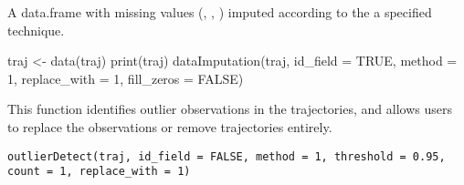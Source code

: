 \documentclass[a4paper]{book}
\begin{document}
%
\begin{Value}
A data.frame with missing values (, , ) imputed according to the a specified technique.
\end{Value}
%
\begin{Examples}
\begin{ExampleCode}
traj <- data(traj)
print(traj)
 dataImputation(traj, id_field = TRUE, method = 1, replace_with = 1, fill_zeros = FALSE)
\end{ExampleCode}
\end{Examples}
%
\begin{Description}\relax
This function identifies outlier observations in the trajectories, and allows users to replace the observations or remove trajectories entirely.
\end{Description}
%
\begin{Usage}
\begin{verbatim}
outlierDetect(traj, id_field = FALSE, method = 1, threshold = 0.95,
count = 1, replace_with = 1)
\end{verbatim}
\end{Usage}
%
\end{document}
